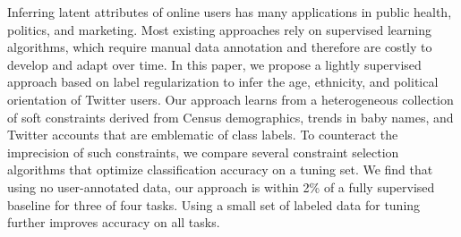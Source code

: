 Inferring latent attributes of online users has many applications in public health, politics, and marketing. Most existing approaches rely on supervised learning algorithms, which require manual data annotation and therefore are costly to develop and adapt over time. In this paper, we propose a lightly supervised approach based on label regularization to infer the age, ethnicity, and political orientation of Twitter users. Our approach learns from a heterogeneous collection of soft constraints derived from Census demographics, trends in baby names, and Twitter accounts that are emblematic of class labels. To counteract the imprecision of such constraints, we compare several constraint selection algorithms that optimize classification accuracy on a tuning set. We find that using no user-annotated data, our approach is within 2\% of a fully supervised baseline for three of four tasks. Using a small set of labeled data for tuning further improves accuracy on all tasks.

